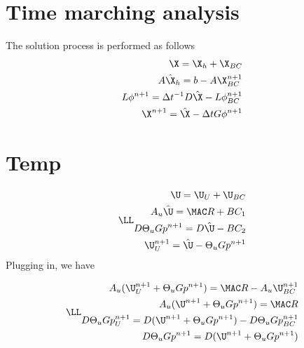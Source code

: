 \documentclass{article}
\begin{document}
\doublespacing
\MOONSTITLE

\section{Time marching analysis}
The solution process is performed as follows
\begin{equation}\begin{aligned}
\X = \X_{h} + \X_{BC} \\
A\hat{\X}_{h} = b - A\X^{n+1}_{BC} \\
L \phi^{n+1} = \Delta t^{-1} D \hat{\X} - L \phi^{n+1}_{BC} \\
\X^{n+1} = \hat{\X} - \Delta t G \phi^{n+1}
\end{aligned} \end{equation}

\section{Temp}
\begin{equation}\LL\begin{aligned}
\U = \U_U+\U_{BC} \\
A_u \hat{\U} = \MAC R + BC_1 \\
D \Theta_u G p^{n+1} = D\hat{\U} - BC_2 \\
\U^{n+1}_U = \hat{\U} - \Theta_u G p^{n+1}
\end{aligned} \end{equation}
Plugging in, we have

\begin{equation}\LL\begin{aligned}
A_u (\U^{n+1}_U + \Theta_u G p^{n+1}) = \MAC R - A_u \U^{n+1}_{BC} \\
A_u (\U^{n+1} + \Theta_u G p^{n+1}) = \MAC R \\
D \Theta_u G p^{n+1}_U = D(\U^{n+1} + \Theta_u G p^{n+1}) - D \Theta_u G p^{n+1}_{BC} \\
D \Theta_u G p^{n+1} = D(\U^{n+1} + \Theta_u G p^{n+1}) \\
\end{aligned} \end{equation}


\end{document}
